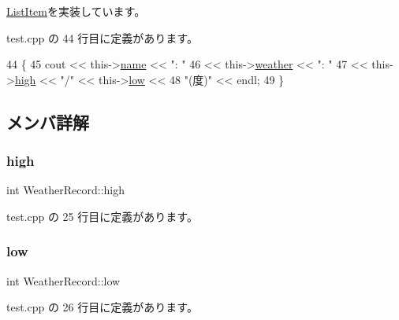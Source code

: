 \hyperlink{class_list_item_a0bb35843489312a6796d6f94f4395399}{List\+Item}を実装しています。



 test.\+cpp の 44 行目に定義があります。


\begin{DoxyCode}
44                 \{
45         cout << this->\hyperlink{class_list_item_a721391bcdefb1a5f77b79295a80b0305}{name} << \textcolor{stringliteral}{": "} 
46         << this->\hyperlink{class_weather_record_a3b9b2139f84c02e1ba36b1bee333e057}{weather} << \textcolor{stringliteral}{": "} 
47         << this->\hyperlink{class_weather_record_ab1f968211ccc7fe600f76d31f3b0edc9}{high} << \textcolor{stringliteral}{"/"} << this->\hyperlink{class_weather_record_a16a7592e80388a4b2091c027cd18aed3}{low} << 
48         \textcolor{stringliteral}{"(度)"} << endl;
49     \}
\end{DoxyCode}


\subsection{メンバ詳解}
\mbox{\label{class_weather_record_ab1f968211ccc7fe600f76d31f3b0edc9}} 
\subsubsection{\texorpdfstring{high}{high}}
{\footnotesize\ttfamily int Weather\+Record\+::high\hspace{0.3cm}{\ttfamily [private]}}



 test.\+cpp の 25 行目に定義があります。

\mbox{\label{class_weather_record_a16a7592e80388a4b2091c027cd18aed3}} 
\subsubsection{\texorpdfstring{low}{low}}
{\footnotesize\ttfamily int Weather\+Record\+::low\hspace{0.3cm}{\ttfamily [private]}}



 test.\+cpp の 26 行目に定義があります。

